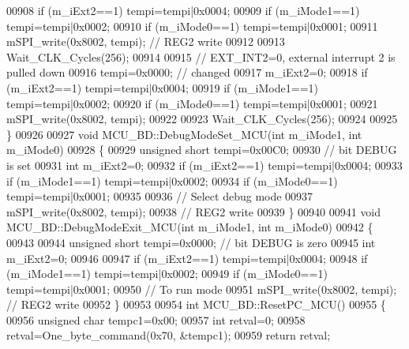 \begin{DoxyCode}
{{{{{{00908     \textcolor{keywordflow}{if} (m\_iExt2==1)  tempi=tempi|0x0004;
00909     \textcolor{keywordflow}{if} (m\_iMode1==1) tempi=tempi|0x0002;
00910     \textcolor{keywordflow}{if} (m\_iMode0==1) tempi=tempi|0x0001;
00911     mSPI\_write(0x8002, tempi); \textcolor{comment}{// REG2 write}
00912 
00913     Wait\_CLK\_Cycles(256);
00914 
00915     \textcolor{comment}{// EXT\_INT2=0, external interrupt 2 is pulled down}
00916     tempi=0x0000; \textcolor{comment}{// changed}
00917     m\_iExt2=0;
00918     \textcolor{keywordflow}{if} (m\_iExt2==1)  tempi=tempi|0x0004;
00919     \textcolor{keywordflow}{if} (m\_iMode1==1) tempi=tempi|0x0002;
00920     \textcolor{keywordflow}{if} (m\_iMode0==1) tempi=tempi|0x0001;
00921     mSPI\_write(0x8002, tempi);
00922 
00923     Wait\_CLK\_Cycles(256);
00924 
00925 \}
00926 
00927 \textcolor{keywordtype}{void} MCU\_BD::DebugModeSet\_MCU(\textcolor{keywordtype}{int} m\_iMode1, \textcolor{keywordtype}{int} m\_iMode0)
00928 \{
00929         \textcolor{keywordtype}{unsigned} \textcolor{keywordtype}{short} tempi=0x00C0;
00930         \textcolor{comment}{// bit DEBUG is set}
00931         \textcolor{keywordtype}{int} m\_iExt2=0;
00932         \textcolor{keywordflow}{if} (m\_iExt2==1)  tempi=tempi|0x0004;
00933         \textcolor{keywordflow}{if} (m\_iMode1==1) tempi=tempi|0x0002;
00934         \textcolor{keywordflow}{if} (m\_iMode0==1) tempi=tempi|0x0001;
00935 
00936         \textcolor{comment}{// Select debug mode}
00937         mSPI\_write(0x8002, tempi);
00938         \textcolor{comment}{// REG2 write}
00939 \}
00940 
00941  \textcolor{keywordtype}{void} MCU\_BD::DebugModeExit\_MCU(\textcolor{keywordtype}{int} m\_iMode1, \textcolor{keywordtype}{int} m\_iMode0)
00942 \{
00943 
00944         \textcolor{keywordtype}{unsigned} \textcolor{keywordtype}{short} tempi=0x0000; \textcolor{comment}{// bit DEBUG is zero}
00945         \textcolor{keywordtype}{int} m\_iExt2=0;
00946 
00947         \textcolor{keywordflow}{if} (m\_iExt2==1)  tempi=tempi|0x0004;
00948         \textcolor{keywordflow}{if} (m\_iMode1==1) tempi=tempi|0x0002;
00949         \textcolor{keywordflow}{if} (m\_iMode0==1) tempi=tempi|0x0001;
00950         \textcolor{comment}{// To run mode}
00951         mSPI\_write(0x8002, tempi);  \textcolor{comment}{// REG2 write}
00952 \}
00953 
00954 \textcolor{keywordtype}{int} MCU\_BD::ResetPC\_MCU()
00955 \{
00956      \textcolor{keywordtype}{unsigned} \textcolor{keywordtype}{char} tempc1=0x00;
00957      \textcolor{keywordtype}{int} retval=0;
00958      retval=One\_byte\_command(0x70, &tempc1);
00959      \textcolor{keywordflow}{return} retval;
}}}}}}
\end{DoxyCode}
